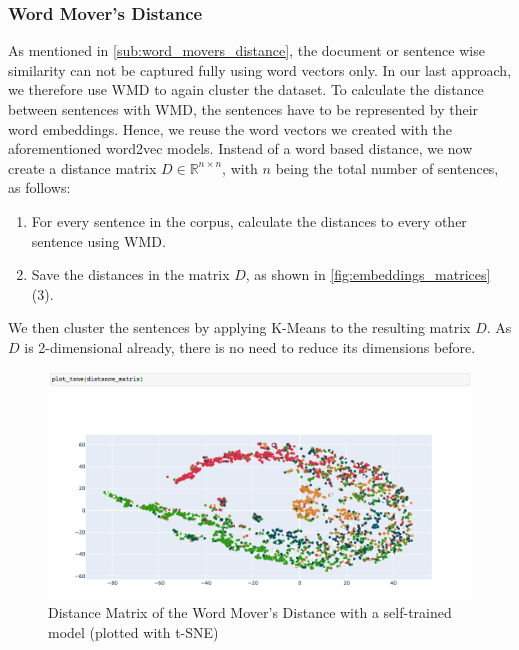 \subsubsection{Word Mover's Distance} %
\label{sub:own_wmd}
As mentioned in \autoref{sub:word_movers_distance}, the document or sentence wise similarity can not be captured fully using word vectors only. In our last approach, we therefore use WMD to again cluster the dataset. To calculate the distance between sentences with WMD, the sentences have to be represented by their word embeddings. Hence, we reuse the word vectors we created with the aforementioned word2vec models. Instead of a word based distance, we now create a distance matrix $D\in\mathbb{R}^{n\times n}$, with $n$ being the total number of sentences, as follows:
\begin{enumerate}
	\item For every sentence in the \crowdre{} corpus, calculate the distances to every other sentence using WMD.
	\item Save the distances in the matrix $D$, as shown in \autoref{fig:embeddings_matrices} (3).
\end{enumerate}
We then cluster the sentences by applying K-Means to the resulting matrix $D$. 
As $D$ is 2-dimensional already, there is no need to reduce its dimensions before.

 \begin{figure}[ht]
  \begin{center}
    \includegraphics[width=\textwidth]{screenshots/our_word_movers_distance_tsne.png}
    \caption{Distance Matrix of the Word Mover's Distance with a self-trained model (plotted with t-SNE)}
    \label{fig:wmd-selftrained-1}
  \end{center}
\end{figure}
\FloatBarrier